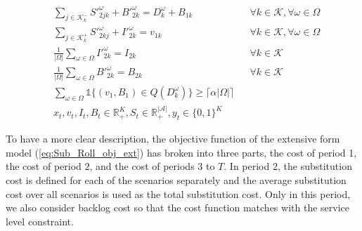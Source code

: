 \documentclass[10pt]{article}
\newcommand{\ti}{t} %
\newcommand{\TI}{\mathcal{T}}
\newcommand{\Ti}{T}
\newcommand{\ka}{k} %
\newcommand{\KA}{\mathcal{K}}
\newcommand{\Ka}{K}
\newcommand{\jey}{j} %
\newcommand{\Graf}{\mathcal{A}} %
\newcommand{\Bi}{B} %
\newcommand{\Vi}{v} %
\newcommand{\m}{\omega} %
\newcommand{\Em}{|\Omega|} %
\newcommand{\EM}{\Omega} %
\newcommand{\Csub}{\mathcal{K}^+_k}
\newcommand{\Psub}{\mathcal{K}^-_k}
\newcommand{\cred}{\color{red!65!black}}
\begin{document}
\begin{subequations}
\begin{alignat}{2}
 &  \sum_{\jey \in  \Psub} {S'}^{\m}_{2 \jey \ka} + B'^{\m}_{2  \ka }  = D^ {\m}_{\ka} + {B}_{1  \ka} &&\forall \ka \in \KA, \forall \m \in \EM     \label{eq:Det_backorder_tnp} \\
&  \sum_{\jey \in  \Csub} {S'}^{\m}_{2 \ka \jey} + I'^{\m}_{2  \ka} = v_{1  \ka} &&\forall \ka \in \KA, \forall \m \in \EM       \label{eq:Det_inventory_tnp}\\
& \frac{1}{\Em} \sum_{\m \in \EM} I'^{\m}_{2 \ka } = I_{2 \ka} &&\forall \ka \in \KA  \label{eq:Average_Inventory} \\
& \frac{1}{\Em} \sum_{\m \in \EM} B'^{\m}_{2 \ka} = B_{2 \ka} &&\forall \ka \in \KA  \label{eq:Average_Backlog}\\
& \sum_ {\m \in \EM}  \mathds{1} {\{ ({\Vi}_{1}, {\Bi}_{1} ) \in Q(D^ {\m}_{\ka} ) \}} \geq \lceil \alpha |\EM|  \rceil \label{eq:chance_ServiceLevel}\\
&{x}_{ \ti },  {v}_{ \ti },  {I}_{ \ti} , {\Bi}_{ \ti } \in \mathbb{R}_{+}^{\Ka} , {S}_{\ti} \in \mathbb{R}_{+}^{|\Graf|} ,{y}_{ \ti } \in \{0,1\}^{\Ka} \label{eq:Sub_FD_bound3}
\end{alignat}

  \end{subequations}
  
To have a more clear description, the objective function of the extensive form model (\ref{eq:Sub_Roll_obj_ext}) has broken into three parts, the cost of period 1, the cost of period $2$, and the cost of periods $3$ to $\Ti$. In period $2$, the substitution cost is defined for each of the scenarios separately and the average substitution cost over all scenarios is used as the total substitution cost. {\cred Only in this period, we also consider backlog cost so that the cost function matches with the service level constraint.} 
 
\end{document}

